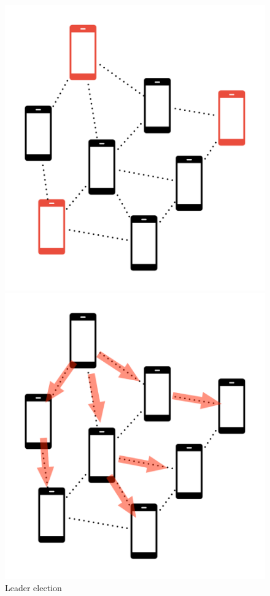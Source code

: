\documentclass[12pt,a4paper,openright,twoside]{book}
\begin{document}
\begin{figure}[H]
    \centering
    \begin{minipage}[b]{0.3\textwidth}
        \includegraphics[width=\textwidth]{figures/leader-election.pdf}
        \caption{Leader election}
        \label{fig:leader-election}
    \end{minipage}
    \hfill
    \begin{minipage}[b]{0.3\textwidth}
        \includegraphics[width=\textwidth]{figures/gradient-cast.pdf}

\end{minipage}
\end{figure}
\end{document}
